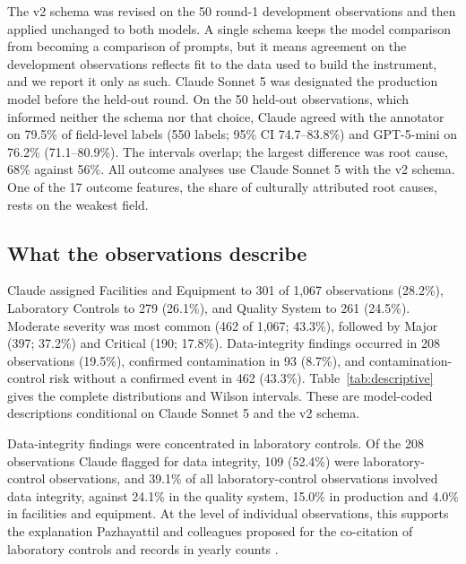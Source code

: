 \documentclass[12pt]{article}
\begin{document}
The v2 schema was revised on the 50 round-1 development observations and
then applied unchanged to both models. A single schema keeps the model
comparison from becoming a comparison of prompts, but it means agreement
on the development observations reflects fit to the data used to build the
instrument, and we report it only as such. Claude Sonnet 5 was designated
the production model before the held-out round. On the 50 held-out
observations, which informed neither the schema nor that choice, Claude
agreed with the annotator on 79.5\% of field-level labels (550 labels;
95\% CI 74.7--83.8\%) and GPT-5-mini on 76.2\% (71.1--80.9\%). The
intervals overlap; the largest difference was root cause, 68\% against
56\%. All outcome analyses use Claude Sonnet 5 with the v2 schema. One of
the 17 outcome features, the share of culturally attributed root causes,
rests on the weakest field.


\subsection{What the observations describe}

Claude assigned Facilities and Equipment to 301 of 1,067 observations
(28.2\%), Laboratory Controls to 279 (26.1\%), and Quality System to
261 (24.5\%). Moderate severity was most common (462 of 1,067; 43.3\%),
followed by Major (397; 37.2\%) and Critical (190; 17.8\%).
Data-integrity findings occurred in 208 observations (19.5\%), confirmed
contamination in 93 (8.7\%), and contamination-control risk without a
confirmed event in 462 (43.3\%). Table~\ref{tab:descriptive} gives the
complete distributions and Wilson intervals. These are model-coded
descriptions conditional on Claude Sonnet 5 and the v2 schema.



Data-integrity findings were concentrated in laboratory controls. Of the
208 observations Claude flagged for data integrity, 109 (52.4\%) were
laboratory-control observations, and 39.1\% of all laboratory-control
observations involved data integrity, against 24.1\% in the quality system,
15.0\% in production and 4.0\% in facilities and equipment. At the level of
individual observations, this supports the explanation Pazhayattil and
colleagues proposed for the co-citation of laboratory controls and records
in yearly counts \citep{Pazhayattil2020}.
\end{document}
